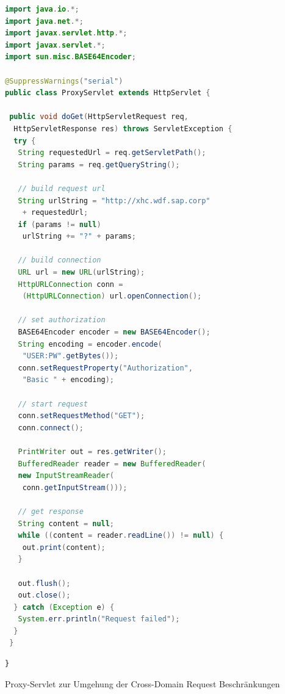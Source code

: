 \begin{lstlisting}[language=Java]
import java.io.*;
import java.net.*;
import javax.servlet.http.*;
import javax.servlet.*;
import sun.misc.BASE64Encoder;

@SuppressWarnings("serial")
public class ProxyServlet extends HttpServlet {

 public void doGet(HttpServletRequest req, 
  HttpServletResponse res) throws ServletException {
  try {
   String requestedUrl = req.getServletPath();
   String params = req.getQueryString();

   // build request url
   String urlString = "http://xhc.wdf.sap.corp"
    + requestedUrl;
   if (params != null)
    urlString += "?" + params;

   // build connection
   URL url = new URL(urlString);
   HttpURLConnection conn =
    (HttpURLConnection) url.openConnection();

   // set authorization
   BASE64Encoder encoder = new BASE64Encoder();
   String encoding = encoder.encode(
    "USER:PW".getBytes());
   conn.setRequestProperty("Authorization",
    "Basic " + encoding);

   // start request
   conn.setRequestMethod("GET");
   conn.connect();

   PrintWriter out = res.getWriter();
   BufferedReader reader = new BufferedReader(
   new InputStreamReader(
    conn.getInputStream()));

   // get response
   String content = null;
   while ((content = reader.readLine()) != null) {
    out.print(content);
   }

   out.flush();
   out.close();
  } catch (Exception e) {
   System.err.println("Request failed");
  }  
 }
\end{lstlisting}

\begin{programm}[ht]
\begin{lstlisting}
}
\end{lstlisting}
\caption{Proxy-Servlet zur Umgehung der Cross-Domain Request Beschränkungen\label{listing:servlet}}
\end{programm}



\newpage
\sePrintGlossary{}

